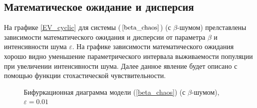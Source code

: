 \subsection{Математическое ожидание и дисперсия}

    На графике \ref{EV_cyclic} для системы (\(\ref{beta_chaos}\)) (с \(\beta\)-шумом) прелставлены зависимости математического ожидания и дисперсии от параметра \(\beta\) и интенсивности шума \(\varepsilon\). На графике зависимости математического ожидания хорошо видно уменьшение параметрического интервала выживаемости популяции при увеличении интенсивности шума. Далее данное явление будет описано с помощью функции стохастической чувствительности.

    \begin{figure}
        \centering
        
        \caption{Бифуркационная диаграмма модели (\ref{beta_chaos}) (с \(\beta\)-шумом), \(\varepsilon = 0.01\)}
    \end{figure}
        
        
